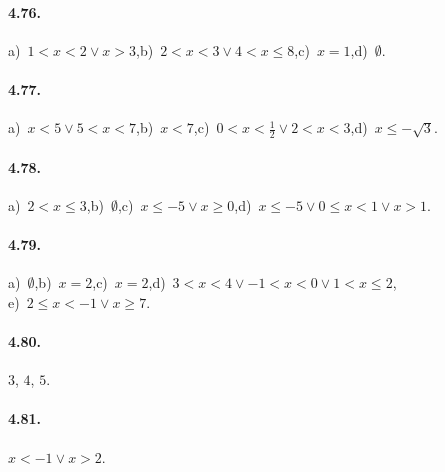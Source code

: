 \paragraph{4.76.} a)~$1<x<2\vee x>3$,\quad b)~$2<x<3\vee 4<x\le 8$,\quad c)~$x=1$,\quad d)~$\emptyset $.

\paragraph{4.77.} a)~$x<5\vee 5<x<7$,\quad b)~$x<7$,\quad c)~$0<x<\frac 1 2\vee 2<x<3$,\quad d)~$x\le -\sqrt 3$.

\paragraph{4.78.} a)~$2<x\le 3$,\quad b)~$\emptyset $,\quad c)~$x\le -5\vee x\ge 0$,\quad d)~$x\le -5\vee 0\le x<1\vee x>1$.

\paragraph{4.79.} a)~$\emptyset $,\quad b)~$x=2$,\quad c)~$x=2$,\quad d)~$3<x<4\vee -1<x<0\vee 1<x\le 2$,\protect\\
e)~$2\le x<-1\vee x\ge 7$.

\paragraph{4.80.} $3$, $4$, $5$.

\paragraph{4.81.} $x<-1\vee x>2$.
